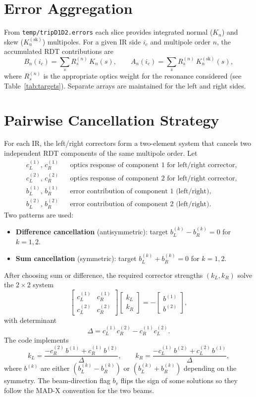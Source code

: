 \documentclass[11pt]{article}
\begin{document}
\section{Error Aggregation}
From \texttt{temp/tripD1D2.errors} each slice provides integrated normal ($K_n$) and skew ($K_n^{(\mathrm{sk})}$) multipoles. For a given IR side $i_c$ and multipole order $n$, the accumulated RDT contributions are
\[
B_n(i_c) = \sum_{s} R^{(n)}_{s}\,K_n(s), \qquad
A_n(i_c) = \sum_{s} R^{(n)}_{s}\,K_n^{(\mathrm{sk})}(s),
\]
where $R^{(n)}_s$ is the appropriate optics weight for the resonance considered (see Table~\ref{tab:targets}). Separate arrays are maintained for the left and right sides.

\section{Pairwise Cancellation Strategy}
For each IR, the left/right correctors form a two-element system that cancels two independent RDT components of the same multipole order. Let
\[
\begin{aligned}
&c_L^{(1)},\,c_R^{(1)} &&\text{optics response of component 1 for left/right corrector},\\
&c_L^{(2)},\,c_R^{(2)} &&\text{optics response of component 2 for left/right corrector},\\
&b^{(1)}_L,\,b^{(1)}_R &&\text{error contribution of component 1 (left/right)},\\
&b^{(2)}_L,\,b^{(2)}_R &&\text{error contribution of component 2 (left/right)}.
\end{aligned}
\]
Two patterns are used:
\begin{itemize}
  \item \textbf{Difference cancellation} (antisymmetric): target $b^{(k)}_L - b^{(k)}_R = 0$ for $k=1,2$.
  \item \textbf{Sum cancellation} (symmetric): target $b^{(k)}_L + b^{(k)}_R = 0$ for $k=1,2$.
\end{itemize}
After choosing sum or difference, the required corrector strengths $(k_L,k_R)$ solve the $2\times 2$ system
\[
\begin{bmatrix}
 c_L^{(1)} & c_R^{(1)} \\
 c_L^{(2)} & c_R^{(2)}
\end{bmatrix}
\begin{bmatrix}
 k_L \\ k_R
\end{bmatrix}
= -
\begin{bmatrix}
 b^{(1)} \\ b^{(2)}
\end{bmatrix},
\]
with determinant
\[
\Delta = c_L^{(1)}c_R^{(2)} - c_R^{(1)}c_L^{(2)}.
\]
The code implements
\[
k_L = \frac{-c_R^{(2)}\,b^{(1)} + c_R^{(1)}\,b^{(2)}}{\Delta}, \qquad
k_R = \frac{-c_L^{(1)}\,b^{(2)} + c_L^{(2)}\,b^{(1)}}{\Delta},
\]
where $b^{(k)}$ are either $(b^{(k)}_L - b^{(k)}_R)$ or $(b^{(k)}_L + b^{(k)}_R)$ depending on the symmetry. The beam-direction flag $b_v$ flips the sign of some solutions so they follow the MAD-X convention for the two beams.
\end{document}
